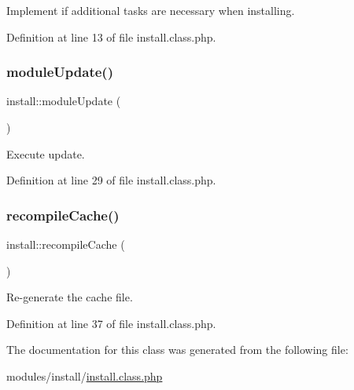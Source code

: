 Implement if additional tasks are necessary when installing. 



Definition at line 13 of file install.\+class.\+php.

\mbox{\label{classinstall_abb5fea730938b38d5347c4ff44644f2d}} 
\subsubsection{\texorpdfstring{module\+Update()}{moduleUpdate()}}
{\footnotesize\ttfamily install\+::module\+Update (\begin{DoxyParamCaption}{ }\end{DoxyParamCaption})}



Execute update. 



Definition at line 29 of file install.\+class.\+php.

\mbox{\label{classinstall_ac0cf9a2eedd8ed9f01b9d848157403d8}} 
\subsubsection{\texorpdfstring{recompile\+Cache()}{recompileCache()}}
{\footnotesize\ttfamily install\+::recompile\+Cache (\begin{DoxyParamCaption}{ }\end{DoxyParamCaption})}



Re-\/generate the cache file. 



Definition at line 37 of file install.\+class.\+php.



The documentation for this class was generated from the following file\+:\begin{DoxyCompactItemize}
\item 
modules/install/\hyperlink{install_8class_8php}{install.\+class.\+php}\end{DoxyCompactItemize}
